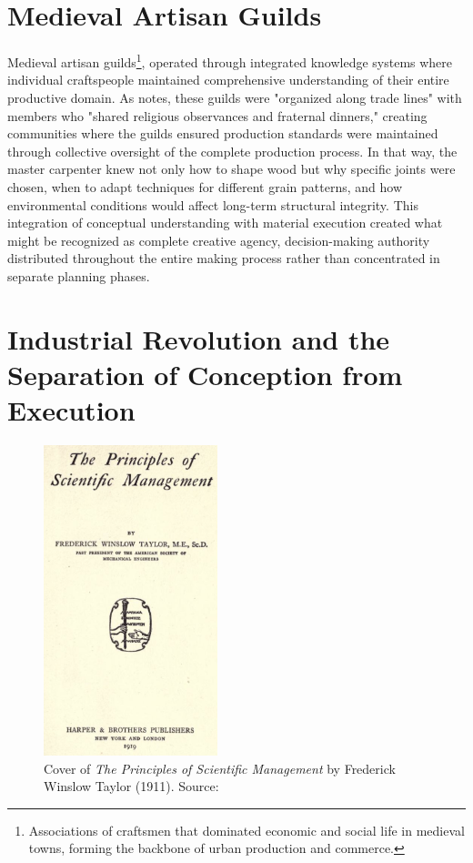 \section{Medieval Artisan Guilds}

Medieval artisan guilds\footnote{Associations of craftsmen that dominated economic and social life in medieval towns, forming the backbone of urban production and commerce.}, operated through integrated knowledge systems where individual craftspeople maintained comprehensive understanding of their entire productive domain. As \citet{richardson2008} notes, these guilds were "organized along trade lines" with members who "shared religious observances and fraternal dinners," creating communities where the guilds ensured production standards were maintained through collective oversight of the complete production process. In that way, the master carpenter knew not only how to shape wood but why specific joints were chosen, when to adapt techniques for different grain patterns, and how environmental conditions would affect long-term structural integrity. This integration of conceptual understanding with material execution created what might be recognized as complete creative agency, decision-making authority distributed throughout the entire making process rather than concentrated in separate planning phases.

\section{Industrial Revolution and the Separation of Conception from Execution}

\begin{figure}[H]
\centering
\includegraphics[width=0.45\textwidth]{figures/chapter1/Scientific_Management.png}
\caption{Cover of \textit{The Principles of Scientific Management} by Frederick Winslow Taylor (1911). Source: \citet{taylor1911}}
\label{fig:scientific_management_cover}
\end{figure}


